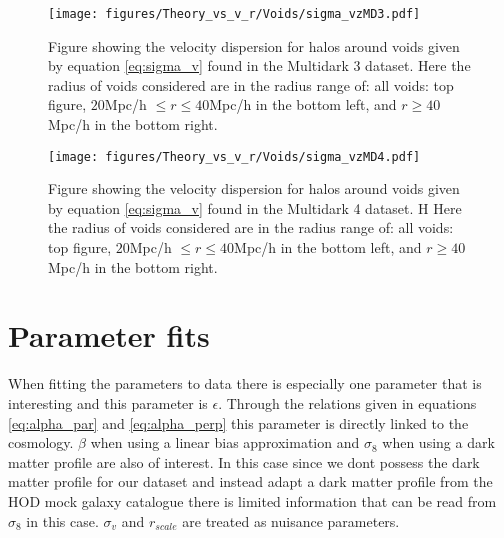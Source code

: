 \begin{figure}[H]
    \texttt{[image: figures/Theory\_vs\_v\_r/Voids/sigma\_vzMD3.pdf]}
    \caption{Figure showing the velocity dispersion for halos around voids given by equation \ref{eq:sigma_v} found in the Multidark 3 dataset. Here the radius of voids considered are in the radius range of: all voids: top figure, $20$Mpc/h $\leq r\leq 40$Mpc/h in the bottom left, and $r\geq 40$Mpc/h in the bottom right.}
    \label{fig:sigmavMD3}
\end{figure}

\begin{figure}[H]
    \texttt{[image: figures/Theory\_vs\_v\_r/Voids/sigma\_vzMD4.pdf]}
    \caption{Figure showing the velocity dispersion for halos around voids given by equation \ref{eq:sigma_v} found in the Multidark 4 dataset. H Here the radius of voids considered are in the radius range of: all voids: top figure, $20$Mpc/h $\leq r\leq 40$Mpc/h in the bottom left, and $r\geq 40$Mpc/h in the bottom right.}
    \label{fig:sigmavMD4}
\end{figure}
\section{Parameter fits}
When fitting the parameters to data there is especially one parameter that is interesting and this parameter is $\epsilon$. Through the relations given in 
equations \ref{eq:alpha_par} and \ref{eq:alpha_perp} this parameter is directly linked to the cosmology. $\beta$ when using a linear bias approximation and $\sigma_8$
when using a dark matter profile are also of interest. In this case since we dont possess the dark matter profile for our dataset and instead adapt a dark matter profile from the HOD mock galaxy catalogue there is limited information that can be read from $\sigma_8$ in this case. $\sigma_v$ and $r_{scale}$ are treated as nuisance parameters.

